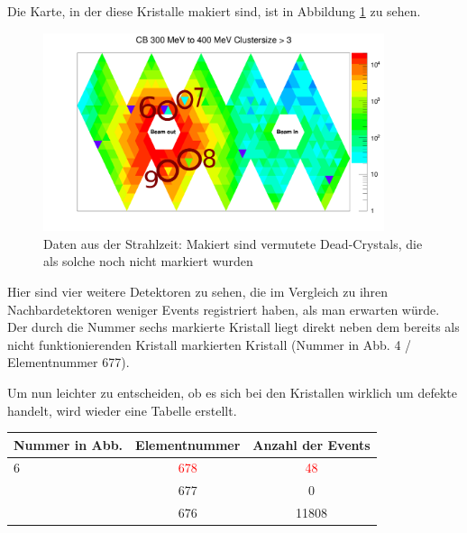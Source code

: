 \documentclass[a4paper,11pt,oneside,final,german,openbib,pdftex]{scrbook}
\begin{document}
{Die Karte, in der diese Kristalle makiert sind, ist in Abbildung \ref{fig:Vermutete-Dead-Crystals-Map} zu sehen.

\begin{figure}[h!]
	\begin{center}
		\includegraphics[width=100mm]{NewCalib/Strahlzeit2014/ClusterSizeNew/20172504StrahlzeitMoreDead}
	\end{center}
\caption[Strahlzeit: Vermutliche Dead-Crystals]{Daten aus der Strahlzeit: Makiert sind vermutete Dead-Crystals, die als solche noch nicht markiert wurden}
\label{fig:Vermutete-Dead-Crystals-Map}

\end{figure}

 Hier sind vier weitere Detektoren zu sehen, die im Vergleich zu ihren Nachbardetektoren weniger Events registriert haben, als man erwarten w\"urde. Der durch die Nummer sechs markierte Kristall liegt direkt neben dem bereits als nicht funktionierenden Kristall markierten Kristall (Nummer in Abb. 4 / Elementnummer 677). 
 
 Um nun leichter zu entscheiden, ob es sich bei den Kristallen wirklich um defekte handelt, wird wieder eine Tabelle erstellt.
 
 
 \begin{table}[h!]
 \begin{center}
 	
 \begin{tabular}{|l|c|c|}
 
 	\hline
 	Nummer in Abb. & Elementnummer&Anzahl der Events \\
	 \hline
 	\hline
 	6& \textcolor{red}{678} &\textcolor{red}{48} \\
 	\cline{2-3} 
 	 & 677&0 \\
 	\cline{2-3}
 	 & 676& 11808\\ 
 	

\end{tabular}
\end{center}
\end{table}}
\end{document}
